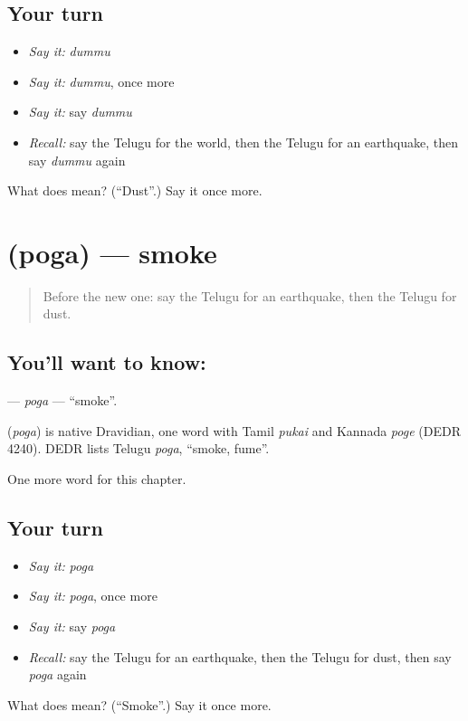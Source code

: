 \subsection*{Your turn}
\begin{itemize}
\raggedright
  \item \emph{Say it:} \emph{dummu}
  \item \emph{Say it:} \emph{dummu}, once more
  \item \emph{Say it:} say \emph{dummu}
  \item \emph{Recall:} say the Telugu for the world, then the Telugu for an earthquake, then say \emph{dummu} again
\end{itemize}

\begin{tcolorbox}[breakable,colback=teal!4,colframe=teal!35!black,title={Before you move on}]
What does  mean? (\textquotedblleft{}Dust\textquotedblright{}.) Say it once more.
\end{tcolorbox}
\section[\texorpdfstring{\te{పొగ} (poga)}{పొగ (poga)}]{ (poga) — smoke}

\label{lesson:TE-C175-poga}



\begin{quote}
Before the new one: say the Telugu for an earthquake, then the Telugu for dust.
\end{quote}

\subsection*{You'll want to know: }
\textbf{} — \emph{poga} — \textquotedblleft{}smoke\textquotedblright{}.

\begin{cousinweb}
\textbf{} (\emph{poga}) is native Dravidian, one word with Tamil \emph{pukai} and Kannada \emph{poge} (DEDR 4240). DEDR lists Telugu \emph{poga}, \textquotedblleft{}smoke, fume\textquotedblright{}.
\end{cousinweb}

\begin{grammarlens}[title={What you've built}]
One more word for this chapter.
\end{grammarlens}

\subsection*{Your turn}
\begin{itemize}
\raggedright
  \item \emph{Say it:} \emph{poga}
  \item \emph{Say it:} \emph{poga}, once more
  \item \emph{Say it:} say \emph{poga}
  \item \emph{Recall:} say the Telugu for an earthquake, then the Telugu for dust, then say \emph{poga} again
\end{itemize}

\begin{tcolorbox}[breakable,colback=teal!4,colframe=teal!35!black,title={Before you move on}]
What does  mean? (\textquotedblleft{}Smoke\textquotedblright{}.) Say it once more.
\end{tcolorbox}
